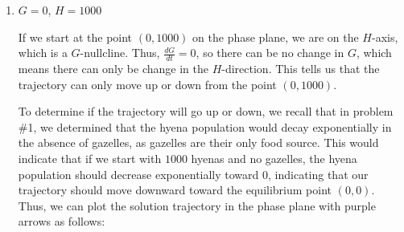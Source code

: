\documentclass[main]{subfiles}
\begin{document}
\begin{enumerate}
\begin{enumerate}
\begin{enumerate}
\begin{solution}
In short, the phase plane only gives us \textit{qualitative} data, while the actual solution function gives us \textit{quantitative} data.

\end{solution}

\item 

\begin{problem}
$G=0$, $H=1000$
\end{problem}

\begin{solution}
If we start at the point $(0,1000)$ on the phase plane, we are on the $H$-axis, which is a $G$-nullcline. Thus, $\frac{dG}{dt}=0$, so there can be no change in $G$, which means there can only be change in the $H$-direction. This tells us that the trajectory can only move up or down from the point $(0,1000)$. 

To determine if the trajectory will go up or down, we recall that in problem \#1, we determined that the hyena population would decay exponentially in the absence of gazelles, as gazelles are their only food source. This would indicate that if we start with $1000$ hyenas and no gazelles, the hyena population should decrease exponentially toward 0, indicating that our trajectory should move downward toward the equilibrium point $(0,0)$. Thus, we can plot the solution trajectory in the phase plane with purple arrows as follows:

\begin{center}
\end{center}


\end{solution}
\end{enumerate}
\end{enumerate}
\end{enumerate}
\end{document}
